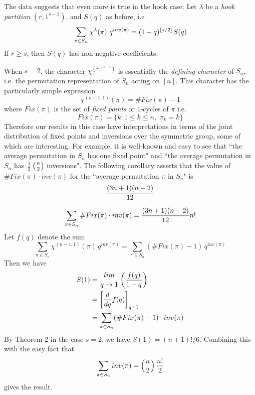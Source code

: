 The data suggests that even more is true in the hook case:
Let $\lambda$ be a {\it hook partition} $(r,1^{s-1})$, and $S(q)$
as before, i.e 
$$
\aligned
\sum_{\pi \in S_n} \chi^{\lambda}(\pi) \,\, q^{inv(\pi)}
                 &= (1-q)^{\lfloor s/2 \rfloor} S(q) \\
\endaligned
$$
If $r \geq s$, then $S(q)$ has non-negative coefficients.
\endproclaim

When $s=2$, the character $\chi^{(r,1^{s-1})}$ is essentially the
{\it defining character} of $S_n$, i.e. the permutation representation
of $S_n$ acting on $[n]$.  This character has the
particularly simple expression
$$\chi^{(n-1,1)}(\pi) = \#Fix(\pi)-1$$
where $Fix(\pi)$ is the set of {\it fixed points} or
$1$-cycles of $\pi$ i.e.
$$Fix(\pi) = \{k: 1 \leq k \leq n,  \,\, \pi_k = k\}$$
Therefore our results in this case have interpretations
in terms of the joint distribution of fixed points and
inversions over the symmetric group, some of which are
interesting.  For example, it is well-known
and easy to see that ``the average permutation 
in $S_n$ has one fixed point" and 
``the average permutation  in $S_n$ has
${1 \over 2} \left( n \atop 2 \right)$ inversions".
The following corollary asserts that the value of
$\#Fix(\pi) \cdot inv(\pi)$ for the ``average
permutation $\pi$ in $S_n$" is 
$${(3n+1)(n-2) \over 12}$$

$$\sum_{\pi \in S_n} \#Fix(\pi) \cdot inv(\pi)
= {(3n+1)(n-2) \over 12} n!$$
\endproclaim
{}
  Let $f(q)$ denote the sum
$$\sum_{\pi \in S_n} \chi^{(n-1,1)}(\pi) \, q^{inv(\pi)}
= \sum_{\pi \in S_n} (\#Fix(\pi)-1) \, q^{inv(\pi)}$$
Then we have 
$$
\aligned
S(1) 
 &=  {lim \atop q \rightarrow 1} \left( {f(q) \over 1-q} \right) \\
 &= \left[ {d \over dq} f(q) \right]_{q=1} \\
 &= \sum_{\pi \in S_n} (\#Fix(\pi)-1) \cdot inv(\pi)
\endaligned
$$
By Theorem 2 in the case $s=2$, we have
$S(1) = (n+1)!/6$.  Combining this with the easy fact
that
$$
\sum_{\pi \in S_n} inv(\pi) = 
 \left( n \atop 2 \right)  {n! \over 2}
$$
gives the result.
\endproof

